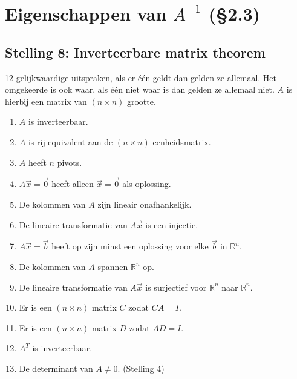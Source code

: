 \section{Eigenschappen van $A^{-1}$ (\S2.3)}
\subsection{Stelling 8: Inverteerbare matrix theorem}   12 gelijkwaardige uitspraken, als er \'e\'en geldt dan gelden ze allemaal. Het omgekeerde is ook waar, als \'e\'en niet waar is dan gelden ze allemaal niet. $A$ is hierbij een matrix van $(n \times n)$ grootte.
\begin{enumerate}
	\item $A$ is inverteerbaar.
	\item $A$ is rij equivalent aan de $(n \times n)$ eenheidsmatrix.
	\item $A$ heeft $n$ pivots.
	\item $A \vec{x} = \vec{0}$ heeft alleen $\vec{x} = \vec{0}$ als oplossing.
	\item De kolommen van $A$ zijn lineair onafhankelijk.
	\item De lineaire transformatie van $A \vec{x}$ is een injectie.
	\item $A \vec{x} = \vec{b}$ heeft op zijn minst een oplossing voor elke $\vec{b}$ in $\mathbb{R}^n$.
	\item De kolommen van $A$ spannen $\mathbb{R}^n$ op.
	\item De lineaire transformatie van $A \vec{x}$ is surjectief voor $\mathbb{R}^n$ naar $\mathbb{R}^n$.
	\item Er is een $(n \times n)$ matrix $C$ zodat $CA = I$.
	\item Er is een $(n \times n)$ matrix $D$ zodat $AD = I$.
	\item $A^T$ is inverteerbaar.
	\item De determinant van $A \neq 0$. (Stelling 4) 
\end{enumerate}

